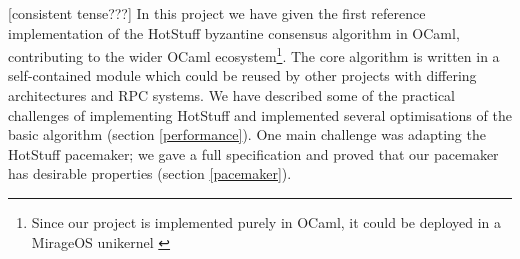 




[consistent tense???]
In this project we have given the first reference implementation of the HotStuff byzantine consensus algorithm in OCaml, contributing to the wider OCaml ecosystem\footnote{Since our project is implemented purely in OCaml, it could be deployed in a MirageOS unikernel \cite{noauthor_mirageos_nodate}}. The core algorithm is written in a self-contained module which could be reused by other projects with differing architectures and RPC systems. We have described some of the practical challenges of implementing HotStuff and implemented several optimisations of the basic algorithm (section \ref{performance}). One main challenge was adapting the HotStuff pacemaker; we gave a full specification and proved that our pacemaker has desirable properties (section \ref{pacemaker}).

